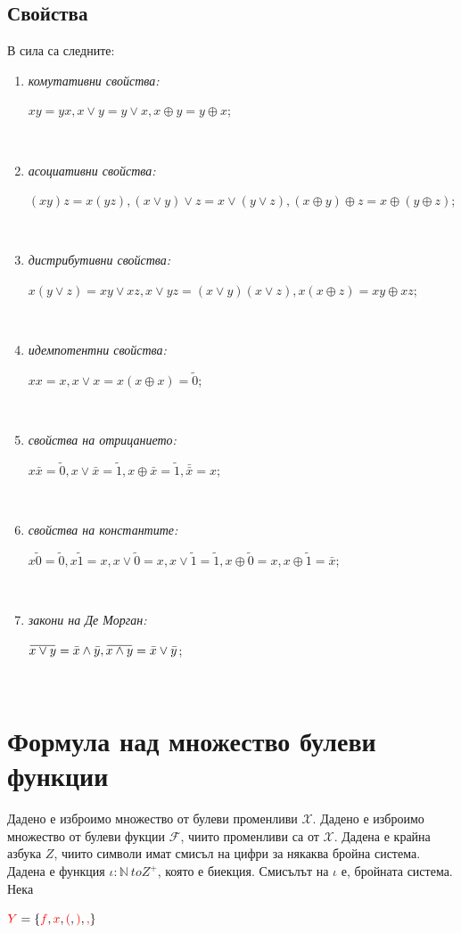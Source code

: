\documentclass[11pt]{article} %
\newcommand{\redText}[1]{\textcolor{red}{#1}}
\newcommand{\curlies}[1]{\{#1\}}
\newcommand{\overbar}[1]{\mkern 1.5mu\overline{\mkern-1.5mu#1\mkern-1.5mu}\mkern 1.5mu}
\newcommand{\enumlet}{\renewcommand{\theenumi}{\alph{enumi}}}
\begin{document}
\subsection{Свойства}
В сила са следните:
\enumlet
\begin{enumerate}
	\item \textit{комутативни свойства:}\\ 
		\centerline{$xy = yx, x \vee y = y \vee x, x \oplus y = y \oplus x$;} \\
	\item \textit{асоциативни свойства:}\\ 
		\centerline{$(xy)z = x(yz), (x \vee y) \vee z = x \vee (y \vee z), (x \oplus y)\oplus z = x \oplus (y \oplus z)$;} \\
	\item \textit{дистрибутивни свойства:}\\ 
		\centerline{$x(y \vee z) = xy \vee xz, x \vee yz = (x \vee y)(x \vee z), x(x \oplus z) = xy \oplus xz$;} \\
	\item \textit{идемпотентни свойства:}\\ 
		\centerline{$xx = x, x \vee x = x(x \oplus x) = \tilde{0}$;} \\
	\item \textit{свойства на отрицанието:}\\ 
		\centerline{$x\bar{x} = \tilde{0}, x \vee \bar{x} = \tilde{1}, x \oplus \bar{x} = \tilde{1}, \bar{\bar{x}} = x$;} \\
	\item \textit{свойства на константите:}\\ 
		\centerline{$x\tilde{0} = \tilde{0}, x\tilde{1} = x, x \vee \tilde{0} = x, x \vee \tilde{1} = \tilde{1}, x \oplus \tilde{0} = x, x \oplus \tilde{1} = \bar{x}$;} \\
	\item \textit{закони на Де Морган:}\\ 
		\centerline{$\overbar{x \vee y} = \bar{x} \wedge \bar{y},\overbar{x \wedge y} = \bar{x} \vee \bar{y}$;} \\
\end{enumerate}

\section{Формула над множество булеви функции \cite{fmiLectures}}

Дадено е изброимо множество от булеви променливи $\mathcal{X}$. Дадено е изброимо множество
от булеви фукции $\mathcal{F}$, чиито променливи са от $\mathcal{X}$. Дадена е крайна азбука $Z$, чиито символи
имат смисъл на цифри за някаква бройна система. Дадена е функция $\iota : \mathbb{N} \ to Z^{+}$, която е
биекция. Смисълът на $\iota$ е, бройната система. Нека\\
\centerline{$\redText{Y} = \curlies{\redText{f}, \redText{x}, \redText{(}, \redText{)}, \redText{,}}$}\\
\end{document}
